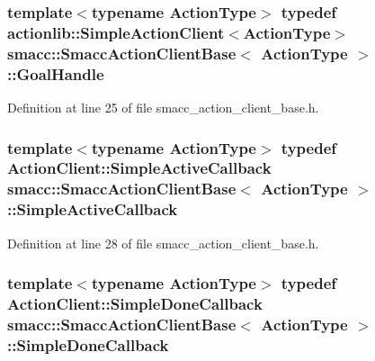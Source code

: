 \subsubsection[{\texorpdfstring{Goal\+Handle}{GoalHandle}}]{\setlength{\rightskip}{0pt plus 5cm}template$<$typename Action\+Type$>$ typedef actionlib\+::\+Simple\+Action\+Client$<$Action\+Type$>$ {\bf smacc\+::\+Smacc\+Action\+Client\+Base}$<$ Action\+Type $>$\+::{\bf Goal\+Handle}}\hypertarget{classsmacc_1_1SmaccActionClientBase_a70384df77a0bbf416475e730960a77cf}{}\label{classsmacc_1_1SmaccActionClientBase_a70384df77a0bbf416475e730960a77cf}


Definition at line 25 of file smacc\+\_\+action\+\_\+client\+\_\+base.\+h.

\subsubsection[{\texorpdfstring{Simple\+Active\+Callback}{SimpleActiveCallback}}]{\setlength{\rightskip}{0pt plus 5cm}template$<$typename Action\+Type$>$ typedef Action\+Client\+::\+Simple\+Active\+Callback {\bf smacc\+::\+Smacc\+Action\+Client\+Base}$<$ Action\+Type $>$\+::{\bf Simple\+Active\+Callback}}\hypertarget{classsmacc_1_1SmaccActionClientBase_ab99def4cdf0522abaf5a3bf7a444cfcb}{}\label{classsmacc_1_1SmaccActionClientBase_ab99def4cdf0522abaf5a3bf7a444cfcb}


Definition at line 28 of file smacc\+\_\+action\+\_\+client\+\_\+base.\+h.

\subsubsection[{\texorpdfstring{Simple\+Done\+Callback}{SimpleDoneCallback}}]{\setlength{\rightskip}{0pt plus 5cm}template$<$typename Action\+Type$>$ typedef Action\+Client\+::\+Simple\+Done\+Callback {\bf smacc\+::\+Smacc\+Action\+Client\+Base}$<$ Action\+Type $>$\+::{\bf Simple\+Done\+Callback}}\hypertarget{classsmacc_1_1SmaccActionClientBase_a185a419026fcdbec9ddf4703a1505524}{}\label{classsmacc_1_1SmaccActionClientBase_a185a419026fcdbec9ddf4703a1505524}


